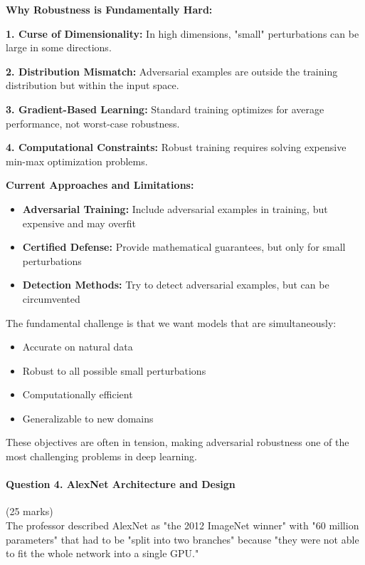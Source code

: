 \documentclass[12pt]{article}
\begin{document}
\begin{enumerate}[(a)]
{    \textbf{Why Robustness is Fundamentally Hard:}
    
    \textbf{1. Curse of Dimensionality:}
    In high dimensions, "small" perturbations can be large in some directions.
    
    \textbf{2. Distribution Mismatch:}
    Adversarial examples are outside the training distribution but within the input space.
    
    \textbf{3. Gradient-Based Learning:}
    Standard training optimizes for average performance, not worst-case robustness.
    
    \textbf{4. Computational Constraints:}
    Robust training requires solving expensive min-max optimization problems.
    
    \textbf{Current Approaches and Limitations:}
    \begin{itemize}
        \item \textbf{Adversarial Training:} Include adversarial examples in training, but expensive and may overfit
        \item \textbf{Certified Defense:} Provide mathematical guarantees, but only for small perturbations
        \item \textbf{Detection Methods:} Try to detect adversarial examples, but can be circumvented
    \end{itemize}
    
    The fundamental challenge is that we want models that are simultaneously:
    \begin{itemize}
        \item Accurate on natural data
        \item Robust to all possible small perturbations
        \item Computationally efficient
        \item Generalizable to new domains
    \end{itemize}
    
    These objectives are often in tension, making adversarial robustness one of the most challenging problems in deep learning.
    }
\end{enumerate}

\newpage
\paragraph{Question 4. AlexNet Architecture and Design}{\hfill (25 marks)}\\
The professor described AlexNet as "the 2012 ImageNet winner" with "60 million parameters" that had to be "split into two branches" because "they were not able to fit the whole network into a single GPU."
\end{document}
